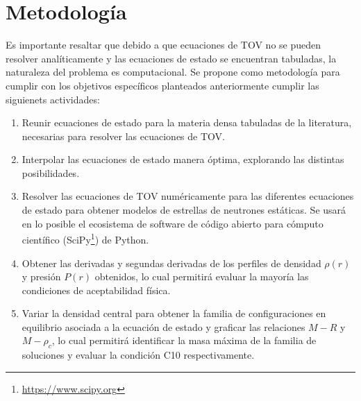 \chapter{Metodología}
\setcounter{footnote}{0}
Es importante resaltar que debido a que ecuaciones de TOV no se pueden resolver analíticamente y las ecuaciones de estado se encuentran tabuladas, la naturaleza del problema es computacional. 
Se propone como metodología para cumplir con los objetivos específicos planteados anteriormente cumplir las siguienets actividades:

\begin{enumerate}
    \item Reunir ecuaciones de estado para la materia densa tabuladas de la literatura, necesarias para resolver las ecuaciones de TOV.
    \item Interpolar las ecuaciones de estado manera óptima, explorando las distintas posibilidades.
    \item Resolver las ecuaciones de TOV numéricamente para las diferentes ecuaciones de estado para obtener modelos de estrellas de neutrones estáticas. Se usará en lo posible el ecosistema de software de código abierto para cómputo científico (SciPy\footnote{\url{https://www.scipy.org}}) de Python.
    \item Obtener las derivadas y segundas derivadas de los perfiles de densidad $\rho(r)$ y presión $P(r)$ obtenidos, lo cual permitirá evaluar la mayoría las condiciones de aceptabilidad física. 
    \item Variar la densidad central para obtener la familia de configuraciones en equilibrio asociada a la ecuación de estado y graficar las relaciones $M-R$ y $M-\rho_c$, lo cual permitirá identificar la masa máxima de la familia de soluciones y evaluar la condición C10 respectivamente.
\end{enumerate}
